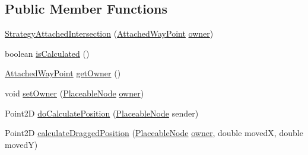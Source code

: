 \subsection*{Public Member Functions}
\begin{DoxyCompactItemize}
\item 
\hyperlink{classorg_1_1tzi_1_1use_1_1gui_1_1views_1_1diagrams_1_1elements_1_1positioning_1_1_strategy_attached_intersection_a2993edae29c59cf8cdb319b00887ddaa}{Strategy\-Attached\-Intersection} (\hyperlink{classorg_1_1tzi_1_1use_1_1gui_1_1views_1_1diagrams_1_1waypoints_1_1_attached_way_point}{Attached\-Way\-Point} \hyperlink{classorg_1_1tzi_1_1use_1_1gui_1_1views_1_1diagrams_1_1elements_1_1positioning_1_1_statefull_position_strategy_ac987ea0c7e5b6ddc09cc5afb41043dfd}{owner})
\item 
boolean \hyperlink{classorg_1_1tzi_1_1use_1_1gui_1_1views_1_1diagrams_1_1elements_1_1positioning_1_1_strategy_attached_intersection_a7a2d9d3d29f05444c794d6d87199c634}{is\-Calculated} ()
\item 
\hyperlink{classorg_1_1tzi_1_1use_1_1gui_1_1views_1_1diagrams_1_1waypoints_1_1_attached_way_point}{Attached\-Way\-Point} \hyperlink{classorg_1_1tzi_1_1use_1_1gui_1_1views_1_1diagrams_1_1elements_1_1positioning_1_1_strategy_attached_intersection_aaa09deacdcec4176d1bf558dcc856bc6}{get\-Owner} ()
\item 
void \hyperlink{classorg_1_1tzi_1_1use_1_1gui_1_1views_1_1diagrams_1_1elements_1_1positioning_1_1_strategy_attached_intersection_a8aa63e3813adc0fb14759110fd020341}{set\-Owner} (\hyperlink{classorg_1_1tzi_1_1use_1_1gui_1_1views_1_1diagrams_1_1elements_1_1_placeable_node}{Placeable\-Node} \hyperlink{classorg_1_1tzi_1_1use_1_1gui_1_1views_1_1diagrams_1_1elements_1_1positioning_1_1_statefull_position_strategy_ac987ea0c7e5b6ddc09cc5afb41043dfd}{owner})
\item 
Point2\-D \hyperlink{classorg_1_1tzi_1_1use_1_1gui_1_1views_1_1diagrams_1_1elements_1_1positioning_1_1_strategy_attached_intersection_a58ae1b33bf2ff7807add590e3807d49e}{do\-Calculate\-Position} (\hyperlink{classorg_1_1tzi_1_1use_1_1gui_1_1views_1_1diagrams_1_1elements_1_1_placeable_node}{Placeable\-Node} sender)
\item 
Point2\-D \hyperlink{classorg_1_1tzi_1_1use_1_1gui_1_1views_1_1diagrams_1_1elements_1_1positioning_1_1_strategy_attached_intersection_a30f965859ce2d066e7704dcf163a5d39}{calculate\-Dragged\-Position} (\hyperlink{classorg_1_1tzi_1_1use_1_1gui_1_1views_1_1diagrams_1_1elements_1_1_placeable_node}{Placeable\-Node} \hyperlink{classorg_1_1tzi_1_1use_1_1gui_1_1views_1_1diagrams_1_1elements_1_1positioning_1_1_statefull_position_strategy_ac987ea0c7e5b6ddc09cc5afb41043dfd}{owner}, double moved\-X, double moved\-Y)

\end{DoxyCompactItemize}
